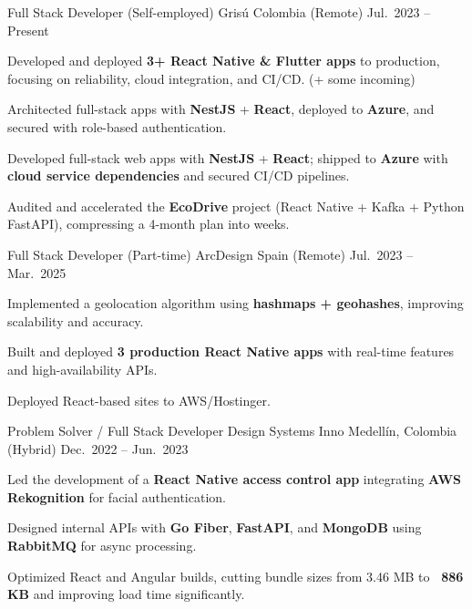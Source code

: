 \begin{cventries}
  \cventry
  {Full Stack Developer (Self-employed)}
  {Grisú}
  {Colombia (Remote)}
  {Jul.\ 2023 -- Present}
  {
    \begin{cvitems}
      \item {Developed and deployed \textbf{3+ React Native \& Flutter apps} to production, focusing on reliability, cloud integration, and CI/CD. (+ some incoming)}
      \item {Architected full-stack apps with \textbf{NestJS} + \textbf{React}, deployed to \textbf{Azure}, and secured with role-based authentication.}
      \item {Developed full-stack web apps with \textbf{NestJS} + \textbf{React}; shipped to \textbf{Azure} with \textbf{cloud service dependencies} and secured CI/CD pipelines.}
      \item {Audited and accelerated the \textbf{EcoDrive} project (React Native + Kafka + Python FastAPI), compressing a 4-month plan into weeks.}
    \end{cvitems}
  }

  \cventry
  {Full Stack Developer (Part-time)}
  {ArcDesign}
  {Spain (Remote)}
  {Jul.\ 2023 -- Mar.\ 2025}
  {
    \begin{cvitems}
      \item {Implemented a geolocation algorithm using \textbf{hashmaps + geohashes}, improving scalability and accuracy.}
      \item {Built and deployed \textbf{3 production React Native apps} with real-time features and high-availability APIs.}
      \item {Deployed React-based sites to AWS/Hostinger.}
    \end{cvitems}
  }

  \cventry
  {Problem Solver / Full Stack Developer}
  {Design Systems Inno}
  {Medellín, Colombia (Hybrid)}
  {Dec.\ 2022 -- Jun.\ 2023}
  {
    \begin{cvitems}
      \item {Led the development of a \textbf{React Native access control app} integrating \textbf{AWS Rekognition} for facial authentication.}
      \item {Designed internal APIs with \textbf{Go Fiber}, \textbf{FastAPI}, and \textbf{MongoDB} using \textbf{RabbitMQ} for async processing.}
      \item {Optimized React and Angular builds, cutting bundle sizes from 3.46 MB to \textbf{~886 KB} and improving load time significantly.}
    \end{cvitems}
  }


\end{cventries}
